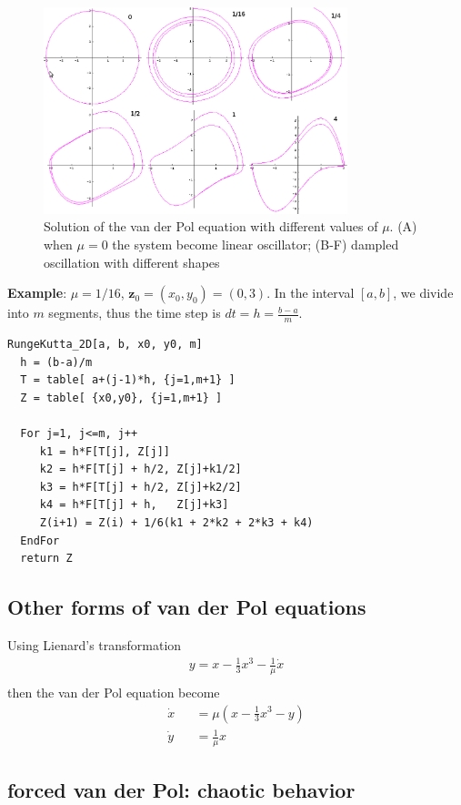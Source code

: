 \begin{figure}[hbt]
  \centerline{\includegraphics[height=6cm,
    angle=0]{./images/van_der_Pol.eps}}
  \caption{Solution of the van der Pol equation with different values
    of $\mu$. (A) when $\mu=0$ the system become linear oscillator; (B-F)
    dampled oscillation with different shapes}
\label{fig:van_der_Pol}
\end{figure}

{\bf Example}: $\mu=1/16$, $\mathbf{z}_0 = (x_0,y_0)=(0,3)$. In the
interval $[a,b]$, we divide into $m$ segments, thus the time step is
$ dt=h=\frac{b-a}{m}$. 
\begin{verbatim}
RungeKutta_2D[a, b, x0, y0, m]
  h = (b-a)/m
  T = table[ a+(j-1)*h, {j=1,m+1} ]
  Z = table[ {x0,y0}, {j=1,m+1} ]

  For j=1, j<=m, j++
     k1 = h*F[T[j], Z[j]]
     k2 = h*F[T[j] + h/2, Z[j]+k1/2]
     k3 = h*F[T[j] + h/2, Z[j]+k2/2]
     k4 = h*F[T[j] + h,   Z[j]+k3]
     Z(i+1) = Z(i) + 1/6(k1 + 2*k2 + 2*k3 + k4) 
  EndFor
  return Z
\end{verbatim}

\subsection{Other forms of van der Pol equations}


Using Lienard's transformation
\begin{eqnarray}
y = x - \frac{1}{3}x^3 - \frac{1}{\mu}\dot{x} \\
\end{eqnarray}
then the van der Pol equation become
\begin{eqnarray*}
\label{eq:vanderPol-Lienard}
    \dot{x} &&= \mu \left( x-\frac{1}{3}x^3 - y \right) \\
    \dot{y} &&= \frac{1}{\mu}x
\end{eqnarray*}

\subsection{forced van der Pol: chaotic behavior}
\label{sec:forced-van-der-Pol-equation}

